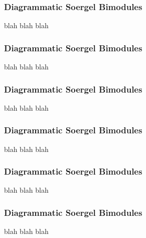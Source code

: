 \begin{frame}
    \frametitle{Diagrammatic Soergel Bimodules}

    blah blah blah
\end{frame}

\begin{frame}
    \frametitle{Diagrammatic Soergel Bimodules}

    blah blah blah
\end{frame}

\begin{frame}
    \frametitle{Diagrammatic Soergel Bimodules}

    blah blah blah
\end{frame}

\begin{frame}
    \frametitle{Diagrammatic Soergel Bimodules}

    blah blah blah
\end{frame}

\begin{frame}
    \frametitle{Diagrammatic Soergel Bimodules}

    blah blah blah
\end{frame}

\begin{frame}
    \frametitle{Diagrammatic Soergel Bimodules}

    blah blah blah
\end{frame}

